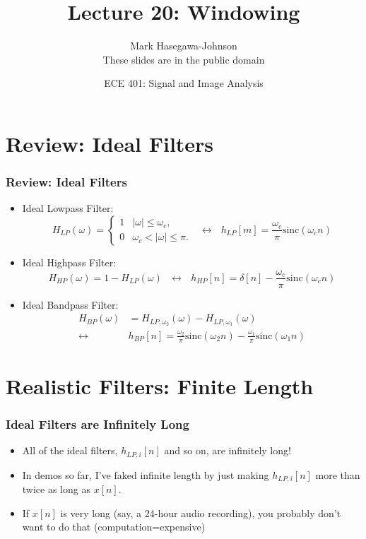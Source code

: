 \documentclass{beamer}
\title{Lecture 20: Windowing}
\author{Mark Hasegawa-Johnson\\These slides are in the public domain}
\date{ECE 401: Signal and Image Analysis}
\begin{document}
\begin{frame}
  \maketitle
\end{frame}

\begin{frame}
  \tableofcontents
\end{frame}

\section[Review]{Review: Ideal Filters}
\setcounter{subsection}{1}

\begin{frame}
  \frametitle{Review: Ideal Filters}
  \begin{itemize}
  \item Ideal Lowpass Filter:
    \[
    H_{LP}(\omega)
    = \begin{cases} 1& |\omega|\le\omega_c,\\
      0 & \omega_c<|\omega|\le\pi.
    \end{cases}~~~\leftrightarrow~~~
    h_{LP}[m]=\frac{\omega_c}{\pi}\mbox{sinc}(\omega_c n)
    \]
  \item Ideal Highpass Filter:
    \[
    H_{HP}(\omega)=1-H_{LP}(\omega)~~~\leftrightarrow~~~
    h_{HP}[n]=\delta[n]-\frac{\omega_c}{\pi}\mbox{sinc}(\omega_c n)
    \]
  \item Ideal Bandpass Filter:
    \begin{align*}
      H_{BP}(\omega)&=H_{LP,\omega_2}(\omega)-H_{LP,\omega_1}(\omega)\\
      \leftrightarrow
      &h_{BP}[n]=\frac{\omega_2}{\pi}\mbox{sinc}(\omega_2 n)-\frac{\omega_1}{\pi}\mbox{sinc}(\omega_1 n)
    \end{align*}
  \end{itemize}
\end{frame}


\section[Finite-Length]{Realistic Filters: Finite Length}
\setcounter{subsection}{1}

\begin{frame}
  \frametitle{Ideal Filters are Infinitely Long}
  
  \begin{itemize}
  \item All of the ideal filters, $h_{LP,i}[n]$ and so on, are infinitely
    long!
  \item In demos so far, I've faked infinite length by just making
    $h_{LP,i}[n]$ more than twice as long as $x[n]$.
  \item If $x[n]$ is very long (say, a 24-hour audio recording), you
    probably don't want to do that (computation=expensive)
  \end{itemize}
\end{frame}
\end{document}
